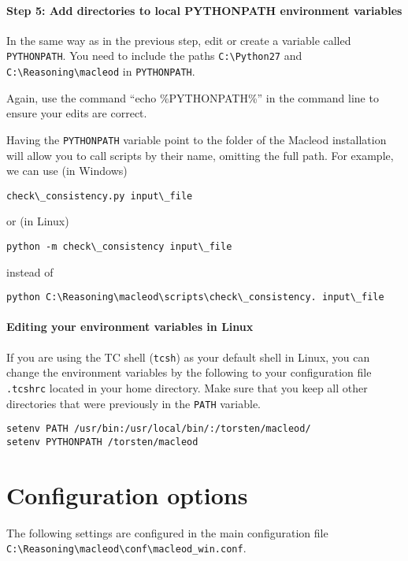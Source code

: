 \documentclass{article}
\begin{document}
\paragraph{Step 5: Add directories to local PYTHONPATH environment variables}

In the same way as in the previous step, edit or create a variable called \texttt{PYTHONPATH}. You need to include the paths \texttt{C:\textbackslash Python27} and \texttt{C:\textbackslash Reasoning\textbackslash macleod} in \texttt{PYTHONPATH}.

Again, use the command ``echo \%PYTHONPATH\%'' in the command line to ensure your edits are correct.

Having the \texttt{PYTHONPATH} variable point to the folder of the Macleod installation will allow you to call scripts by their name, omitting the full path. For example, we can use (in Windows)
\begin{verbatim}
check\_consistency.py input\_file
\end{verbatim}
or (in Linux)
\begin{verbatim}
python -m check\_consistency input\_file
\end{verbatim}
instead of
\begin{verbatim}
python C:\Reasoning\macleod\scripts\check\_consistency. input\_file
\end{verbatim}

\paragraph{Editing your environment variables in Linux}
If you are using the TC shell (\texttt{tcsh}) as your default shell in Linux, you can change the environment variables by the following to your configuration file \texttt{.tcshrc} located in your home directory.  Make sure that you keep all other directories that were previously in the \texttt{PATH} variable.
\begin{verbatim}
setenv PATH /usr/bin:/usr/local/bin/:/torsten/macleod/
setenv PYTHONPATH /torsten/macleod
\end{verbatim}


\section{Configuration options}

The following settings are configured in the main configuration file \texttt{C:\textbackslash Reasoning\textbackslash macleod\textbackslash conf\textbackslash macleod\_win.conf}.
\end{document}

